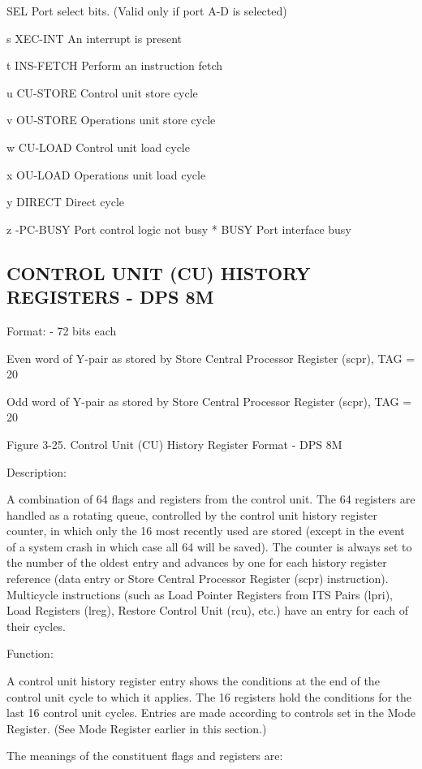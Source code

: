 SEL Port select bits. (Valid only if port A-D is selected)

s XEC-INT An interrupt is present

t INS-FETCH Perform an instruction fetch

u CU-STORE Control unit store cycle

v OU-STORE Operations unit store cycle

w CU-LOAD Control unit load cycle

x OU-LOAD Operations unit load cycle

y DIRECT Direct cycle

z -PC-BUSY Port control logic not busy
* BUSY Port interface busy

\subsection{CONTROL UNIT (CU) HISTORY REGISTERS - DPS 8M}

Format: - 72 bits each

Even word of Y-pair as stored by Store Central Processor Register (scpr), TAG = 20

Odd word of Y-pair as stored by Store Central Processor Register (scpr), TAG = 20

Figure 3-25. Control Unit (CU) History Register Format - DPS 8M

Description:

A combination of 64 flags and registers from the control unit. The 64 registers
are handled as a rotating queue, controlled by the control unit history
register counter, in which only the 16 most recently used are stored (except in
the event of a system crash in which case all 64 will be saved). The counter is
always set to the number of the oldest entry and advances by one for each
history register reference (data entry or Store Central Processor Register
(scpr) instruction). Multicycle instructions (such as Load Pointer Registers
from ITS Pairs (lpri), Load Registers (lreg), Restore Control Unit (rcu), etc.)
have an entry for each of their cycles.

Function:

A control unit history register entry shows the conditions at the end of the
control unit cycle to which it applies. The 16 registers hold the conditions
for the last 16 control unit cycles.  Entries are made according to controls
set in the Mode Register. (See Mode Register earlier in this section.)

The meanings of the constituent flags and registers are:

